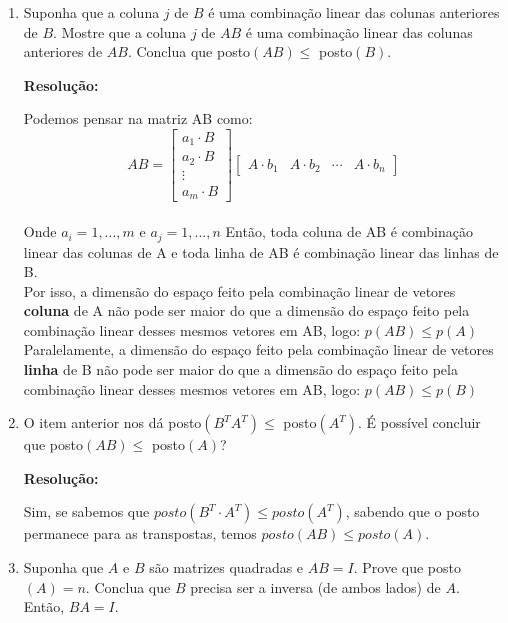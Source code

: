 \documentclass[leqno]{article}
\numberwithin{equation}{section}
\newenvironment{sol}
{
	\vspace{4mm}
	\noindent\textbf{Resolução:}
	\strut\newline
	\smallskip
	\hspace{-3.5mm}
}
{}
\begin{document}
\begin{enumerate}
		\item Suponha que a coluna $j$ de $B$ é uma combinação linear das colunas anteriores de $B$. Mostre que a coluna $j$ de $AB$ é uma combinação linear das colunas anteriores de $AB$. Conclua que posto$(AB) \leq $ posto$(B)$.
		
		\begin{sol} 
			Podemos pensar na matriz AB como:\\
			$$AB = \begin{bmatrix} 
			a_1 \cdot B \\
			a_2 \cdot B \\
			\vdots \\
			a_m \cdot B \end{bmatrix}
			\begin{bmatrix} 
			A \cdot b_1 & A \cdot b_2 & \cdots & A \cdot b_n \end{bmatrix}
			$$\\
			Onde $a_i = 1, ... ,m$ e $a_j = 1, ..., n$
			Então, toda coluna de AB é combinação linear das colunas de A e toda linha de AB é combinação linear das linhas de B.\\
			
			
			Por isso, a dimensão do espaço feito pela combinação linear de vetores \textbf{coluna} de A não pode ser maior do que a dimensão do espaço feito pela combinação linear desses mesmos vetores em AB, logo: $p(AB) \leq p(A)$\\
			
			
			Paralelamente, a dimensão do espaço feito pela combinação linear de vetores \textbf{linha} de B não pode ser maior do que a dimensão do espaço feito pela combinação linear desses mesmos vetores em AB, logo: $p(AB) \leq p(B)$\\
		\end{sol} 
		
		\item O item anterior nos dá posto$(B^T A^T) \leq $ posto$(A^T)$. É possível concluir que posto$(AB) \leq $ posto$(A)$?
		
		\begin{sol} 
			Sim, se sabemos que $posto(B^T \cdot A^T) \leq posto(A^T)$, sabendo que o posto permanece para as transpostas, temos $posto(AB) \leq posto(A)$.    
		\end{sol} 
		
		\item Suponha que $A$ e $B$ são matrizes quadradas e $AB = I$. Prove que posto$(A) = n$. Conclua que $B$ precisa ser a inversa (de ambos lados) de $A$. Então, $BA = I$.
		

\end{enumerate}
\end{document}
